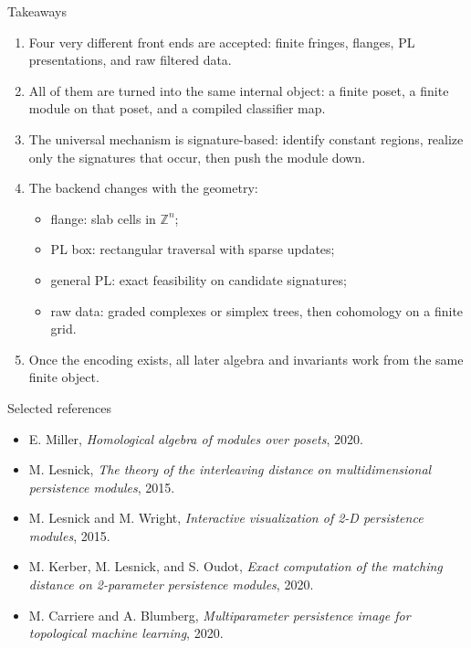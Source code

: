 \documentclass[aspectratio=169,11pt]{beamer}
\newcommand{\Z}{\mathbb{Z}}
\begin{document}
\begin{frame}{Takeaways}
\small
\begin{enumerate}
  \item Four very different front ends are accepted: finite fringes, flanges, PL presentations, and raw filtered data.
  \item All of them are turned into the same internal object: a finite poset, a finite module on that poset, and a compiled classifier map.
  \item The universal mechanism is signature-based: identify constant regions, realize only the signatures that occur, then push the module down.
  \item The backend changes with the geometry:
  \begin{itemize}
    \item flange: slab cells in $\Z^n$;
    \item PL box: rectangular traversal with sparse updates;
    \item general PL: exact feasibility on candidate signatures;
    \item raw data: graded complexes or simplex trees, then cohomology on a finite grid.
  \end{itemize}
  \item Once the encoding exists, all later algebra and invariants work from the same finite object.
\end{enumerate}
\end{frame}

\begin{frame}{Selected references}
\footnotesize
\begin{itemize}
  \item E. Miller, \emph{Homological algebra of modules over posets}, 2020.
  \item M. Lesnick, \emph{The theory of the interleaving distance on multidimensional persistence modules}, 2015.
  \item M. Lesnick and M. Wright, \emph{Interactive visualization of 2-D persistence modules}, 2015.
  \item M. Kerber, M. Lesnick, and S. Oudot, \emph{Exact computation of the matching distance on 2-parameter persistence modules}, 2020.
  \item M. Carriere and A. Blumberg, \emph{Multiparameter persistence image for topological machine learning}, 2020.
\end{itemize}
\end{frame}
\end{document}
